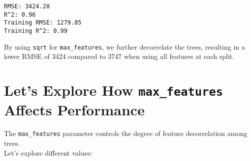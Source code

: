 \documentclass[
  letterpaper,
  DIV=11,
  numbers=noendperiod]{scrreprt}
\begin{document}
\begin{verbatim}
RMSE: 3424.28
R^2: 0.96
Training RMSE: 1279.85
Training R^2: 0.99
\end{verbatim}

By using \texttt{sqrt} for \texttt{max\_features}, we further
decorrelate the trees, resulting in a lower RMSE of 3424 compared to
3747 when using all features at each split.

\section{\texorpdfstring{Let's Explore How \texttt{max\_features}
Affects
Performance}{Let's Explore How max\_features Affects Performance}}\label{lets-explore-how-max_features-affects-performance}

The \texttt{max\_features} parameter controls the degree of feature
decorrelation among trees.\\
Let's explore different values:
\end{document}
